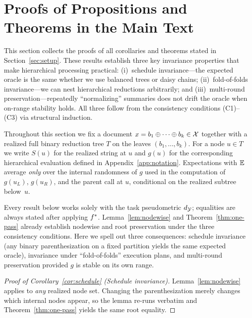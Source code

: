 \section{Proofs of Propositions and Theorems in the Main Text}
\label{app:proofs-core}

This section collects the proofs of all corollaries and theorems stated in Section~\ref{sec:setup}. These results establish three key invariance properties that make hierarchical processing practical: (i)~schedule invariance—the expected oracle is the same whether we use balanced trees or daisy chains; (ii)~fold-of-folds invariance—we can nest hierarchical reductions arbitrarily; and (iii)~multi-round preservation—repeatedly ``normalizing'' summaries does not drift the oracle when on-range stability holds. All three follow from the consistency conditions (C1)--(C3) via structural induction.

Throughout this section we fix a document $x=b_1\oplus\cdots\oplus b_k\in\mathcal{X}$ together with a realized full binary reduction tree $T$ on the leaves $(b_1,\dots,b_k)$. For a node $u\in T$ we write $S(u)$ for the realized string at $u$ and $g(u)$ for the corresponding hierarchical evaluation defined in Appendix~\ref{app:notation}. Expectations with $\mathbb{E}$ average \emph{only} over the internal randomness of $g$ used in the computation of $g(u_L)$, $g(u_R)$, and the parent call at $u$, conditional on the realized subtree below~$u$.

\medskip\noindent
Every result below works solely with the task pseudometric $d_{\mathcal{Y}}$; equalities are always stated after applying $f^{\ast}$. Lemma~\ref{lem:nodewise} and Theorem~\ref{thm:one-pass} already establish nodewise and root preservation under the three consistency conditions. Here we spell out three consequences: schedule invariance (any binary parenthesization on a fixed partition yields the same expected oracle), invariance under ``fold-of-folds'' execution plans, and multi-round preservation provided $g$ is stable on its own range.

\begin{proof}[Proof of Corollary~\ref{cor:schedule} (Schedule invariance)]
\label{proof:cor-schedule}
Lemma~\ref{lem:nodewise} applies to \emph{any} realized node set. Changing the parenthesization merely changes which internal nodes appear, so the lemma re-runs verbatim and Theorem~\ref{thm:one-pass} yields the same root equality.
\end{proof}


